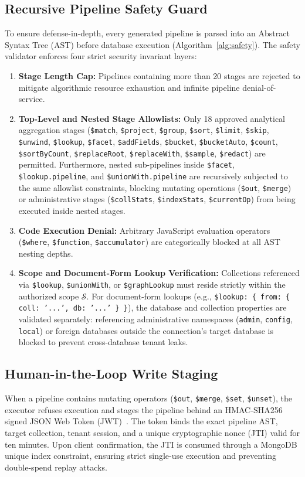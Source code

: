 \subsection{Recursive Pipeline Safety Guard}
To ensure defense-in-depth, every generated pipeline is parsed into an Abstract Syntax Tree (AST) before database execution (Algorithm~\ref{alg:safety}). The safety validator enforces four strict security invariant layers:
\begin{enumerate}
    \item \textbf{Stage Length Cap:} Pipelines containing more than 20 stages are rejected to mitigate algorithmic resource exhaustion and infinite pipeline denial-of-service.
    \item \textbf{Top-Level and Nested Stage Allowlists:} Only 18 approved analytical aggregation stages (\texttt{\$match}, \texttt{\$project}, \texttt{\$group}, \texttt{\$sort}, \texttt{\$limit}, \texttt{\$skip}, \texttt{\$unwind}, \texttt{\$lookup}, \texttt{\$facet}, \texttt{\$addFields}, \texttt{\$bucket}, \texttt{\$bucketAuto}, \texttt{\$count}, \texttt{\$sortByCount}, \texttt{\$replaceRoot}, \texttt{\$replaceWith}, \texttt{\$sample}, \texttt{\$redact}) are permitted. Furthermore, nested sub-pipelines inside \texttt{\$facet}, \texttt{\$lookup.pipeline}, and \texttt{\$unionWith.pipeline} are recursively subjected to the same allowlist constraints, blocking mutating operations (\texttt{\$out}, \texttt{\$merge}) or administrative stages (\texttt{\$collStats}, \texttt{\$indexStats}, \texttt{\$currentOp}) from being executed inside nested stages.
    \item \textbf{Code Execution Denial:} Arbitrary JavaScript evaluation operators (\texttt{\$where}, \texttt{\$function}, \texttt{\$accumulator}) are categorically blocked at all AST nesting depths.
    \item \textbf{Scope and Document-Form Lookup Verification:} Collections referenced via \texttt{\$lookup}, \texttt{\$unionWith}, or \texttt{\$graphLookup} must reside strictly within the authorized scope $\mathcal{S}$. For document-form lookups (e.g., \texttt{\$lookup: \{ from: \{ coll: '...', db: '...' \} \}}), the database and collection properties are validated separately: referencing administrative namespaces (\texttt{admin}, \texttt{config}, \texttt{local}) or foreign databases outside the connection's target database is blocked to prevent cross-database tenant leaks.
\end{enumerate}

\subsection{Human-in-the-Loop Write Staging}
When a pipeline contains mutating operators (\texttt{\$out}, \texttt{\$merge}, \texttt{\$set}, \texttt{\$unset}), the executor refuses execution and stages the pipeline behind an HMAC-SHA256 signed JSON Web Token (JWT)~\cite{jwt2015rfc}. The token binds the exact pipeline AST, target collection, tenant session, and a unique cryptographic nonce (JTI) valid for ten minutes. Upon client confirmation, the JTI is consumed through a MongoDB unique index constraint, ensuring strict single-use execution and preventing double-spend replay attacks.
